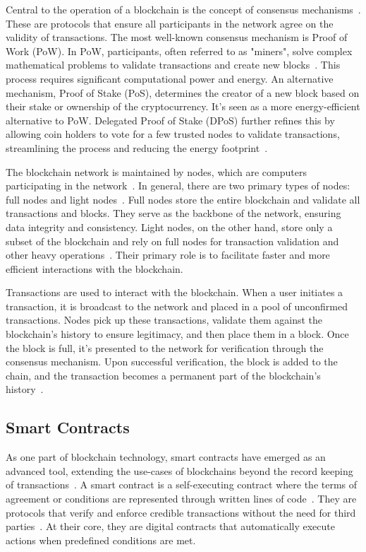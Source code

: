 Central to the operation of a blockchain is the concept of consensus mechanisms~\cite{Tahir.2022}. These are protocols that ensure all participants in the network agree on the validity of transactions. The most well-known consensus mechanism is Proof of Work (PoW). In PoW, participants, often referred to as "miners", solve complex mathematical problems to validate transactions and create new blocks~\cite{Kairaldeen.2021}. This process requires significant computational power and energy. An alternative mechanism, Proof of Stake (PoS), determines the creator of a new block based on their stake or ownership of the cryptocurrency. It's seen as a more energy-efficient alternative to PoW. Delegated Proof of Stake (DPoS) further refines this by allowing coin holders to vote for a few trusted nodes to validate transactions, streamlining the process and reducing the energy footprint~\cite{KUCHKOVSKY.2021}.

The blockchain network is maintained by nodes, which are computers participating in the network~\cite{Xiong.2022}. In general, there are two primary types of nodes: full nodes and light nodes~\cite{Mitra.2021}. Full nodes store the entire blockchain and validate all transactions and blocks. They serve as the backbone of the network, ensuring data integrity and consistency. Light nodes, on the other hand, store only a subset of the blockchain and rely on full nodes for transaction validation and other heavy operations~\cite{Mitra.2021}. Their primary role is to facilitate faster and more efficient interactions with the blockchain.

Transactions are used to interact with the blockchain. When a user initiates a transaction, it is broadcast to the network and placed in a pool of unconfirmed transactions. Nodes pick up these transactions, validate them against the blockchain's history to ensure legitimacy, and then place them in a block. Once the block is full, it's presented to the network for verification through the consensus mechanism. Upon successful verification, the block is added to the chain, and the transaction becomes a permanent part of the blockchain's history~\cite{Xiong.2022}.

\subsection{Smart Contracts}
As one part of blockchain technology, smart contracts have emerged as an advanced tool, extending the use-cases of blockchains beyond the record keeping of transactions~\cite{UchaniGutierrez.2023}. A smart contract is a self-executing contract where the terms of agreement or conditions are represented through written lines of code~\cite{Zhou.2022}. They are protocols that verify and enforce credible transactions without the need for third parties~\cite{Zhou.2022}. At their core, they are digital contracts that automatically execute actions when predefined conditions are met.

